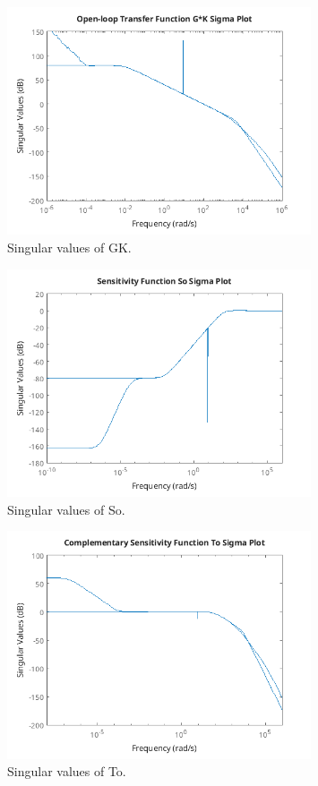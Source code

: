 \documentclass{article}
\begin{document}
\begin{figure}
    \centering
    \includegraphics[width=0.8\textwidth]{sigmaGK.png}
    \caption{Singular values of GK.}
    \label{fig:sigmaGK}
\end{figure}

\begin{figure}
    \centering
    \includegraphics[width=0.8\textwidth]{sigmaSo.png}
    \caption{Singular values of So.}
    \label{fig:sigmaSo}
\end{figure}

\begin{figure}
    \centering
    \includegraphics[width=0.8\textwidth]{sigmaTo.png}
    \caption{Singular values of To.}
    \label{fig:sigmaTo}
\end{figure}
\end{document}
